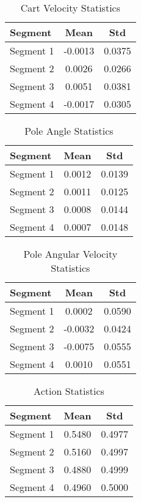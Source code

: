 \documentclass[12pt,letterpaper]{article}
\begin{document}
\begin{table}[htp]
    \centering
    \begin{tabular}{lcc}
        \toprule
        Segment   & Mean    & Std    \\
        \midrule
        Segment 1 & -0.0013 & 0.0375 \\
        Segment 2 & 0.0026  & 0.0266 \\
        Segment 3 & 0.0051  & 0.0381 \\
        Segment 4 & -0.0017 & 0.0305 \\
        \bottomrule
    \end{tabular}
    \caption{Cart Velocity Statistics}
    \label{tab:cartvecv}
\end{table}

\begin{table}[htp]
    \centering
    \begin{tabular}{lcc}
        \toprule
        Segment   & Mean   & Std    \\
        \midrule
        Segment 1 & 0.0012 & 0.0139 \\
        Segment 2 & 0.0011 & 0.0125 \\
        Segment 3 & 0.0008 & 0.0144 \\
        Segment 4 & 0.0007 & 0.0148 \\
        \bottomrule
    \end{tabular}
    \caption{Pole Angle Statistics}
    \label{tab:poleangcv}
\end{table}

\begin{table}[htp]
    \centering
    \begin{tabular}{lcc}
        \toprule
        Segment   & Mean    & Std    \\
        \midrule
        Segment 1 & 0.0002  & 0.0590 \\
        Segment 2 & -0.0032 & 0.0424 \\
        Segment 3 & -0.0075 & 0.0555 \\
        Segment 4 & 0.0010  & 0.0551 \\
        \bottomrule
    \end{tabular}
    \caption{Pole Angular Velocity Statistics}
    \label{tab:poleang2cv}
\end{table}

\begin{table}[htp]
    \centering
    \begin{tabular}{lcc}
        \toprule
        Segment   & Mean   & Std    \\
        \midrule
        Segment 1 & 0.5480 & 0.4977 \\
        Segment 2 & 0.5160 & 0.4997 \\
        Segment 3 & 0.4880 & 0.4999 \\
        Segment 4 & 0.4960 & 0.5000 \\
        \bottomrule
    \end{tabular}
    \caption{Action Statistics}
    \label{tab:actioncv}
\end{table}
\end{document}
